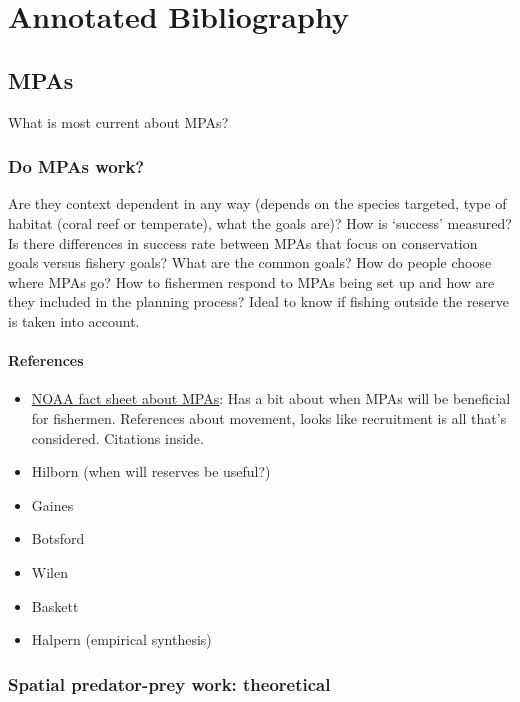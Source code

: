 \documentclass[]{article}
\author{}
\date{}
\begin{document}
\section{Annotated Bibliography}

\subsection{MPAs}

What is most current about MPAs?

\subsubsection{Do MPAs work?}

Are they context dependent in any way (depends on the species targeted,
type of habitat (coral reef or temperate), what the goals are)? How is
`success' measured? Is there differences in success rate between MPAs
that focus on conservation goals versus fishery goals? What are the
common goals? How do people choose where MPAs go? How to fishermen
respond to MPAs being set up and how are they included in the planning
process? Ideal to know if fishing outside the reserve is taken into
account.

\paragraph{References}

\begin{itemize}
\itemsep1pt\parskip0pt
\item
  \href{http://marineprotectedareas.noaa.gov/pdf/helpful-resources/do_no_take_reserves_benefit_adjacent_fisheries.pdf}{NOAA
  fact sheet about MPAs}: Has a bit about when MPAs will be beneficial
  for fishermen. References about movement, looks like recruitment is
  all that's considered. Citations inside.
\item
  Hilborn (when will reserves be useful?)
\item
  Gaines
\item
  Botsford
\item
  Wilen
\item
  Baskett
\item
  Halpern (empirical synthesis)
\end{itemize}

\subsubsection{Spatial predator-prey work: theoretical}
\end{document}
